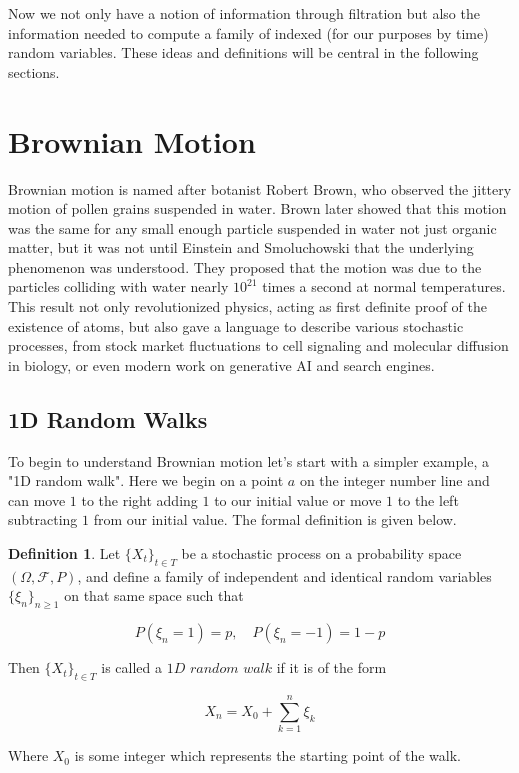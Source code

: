 \documentclass[12pt]{article}
\theoremstyle{definition}
\newtheorem{definition}{Definition}[section]
\theoremstyle{plain}
\theoremstyle{remark}
\begin{document}
Now we not only have a notion of information through filtration but also the information needed to compute a family of indexed (for our purposes by time) random variables.  These ideas and definitions will be central in the following sections.

\section{Brownian Motion}
Brownian motion is named after botanist Robert Brown, who observed the jittery motion of pollen grains suspended in water.  Brown later showed that this motion was the same for any small enough particle suspended in water not just organic matter, but it was not until Einstein and Smoluchowski that the underlying phenomenon was understood.  They proposed that the motion was due to the particles colliding with water nearly $10^{21}$ times a second at normal temperatures.  This result not only revolutionized physics, acting as first definite proof of the existence of atoms, but also gave a language to describe various stochastic processes, from stock market fluctuations to cell signaling and molecular diffusion in biology, or even modern work on generative AI and search engines.

\subsection{1D Random Walks}

To begin to understand Brownian motion let's start with a simpler example, a "1D random walk".  Here we begin on a point $a$ on the integer number line and can move $1$ to the right adding $1$ to our initial value or move $1$ to the left subtracting $1$ from our initial value.  The formal definition is given below.

\begin{definition}
Let $\{X_t\}_{t \in T}$ be a stochastic process on a probability space $(\Omega, \mathcal{F}, P)$, and define a family of independent and identical random variables $\{ \xi_n  \}_{n \geq 1}$ on that same space such that 

\[
P(\xi_n = 1) = p, \quad P(\xi_n = -1) = 1-p
\]

Then $\{X_t\}_{t \in T}$ is called a $\mathit{1D}$ $\mathit{random}$ $\mathit{walk}$ if it is of the form

\[
X_n = X_0 + \sum_{k=1}^n\xi_k
\]

Where $X_0$ is some integer which represents the starting point of the walk.
\end{definition}
\end{document}
